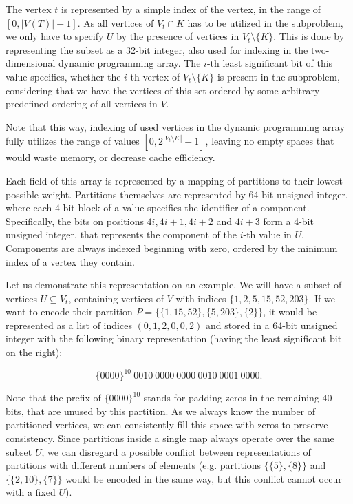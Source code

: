 \documentclass[thesis=M,english,hidelinks]{FITthesis}[2012/10/20]
\theoremstyle{definition}
\begin{document}
The vertex $t$ is represented by a simple index of the vertex, in the range of $[0, |V(T)| - 1]$. As all
vertices of $V_t \cap K$ has to be utilized in the subproblem, we only have to specify $U$ by the presence of vertices in
$V_t \setminus \{K\}$. This is done by representing the subset as a 32-bit integer, also used for indexing in the
two-dimensional dynamic programming array. The $i$-th least significant bit of this value specifies, whether the $i$-th
vertex of $V_t \setminus \{K\}$ is present in the subproblem, considering that we have the vertices of this set ordered
by some arbitrary predefined ordering of all vertices in $V$.

Note that this way, indexing of used vertices in the dynamic programming array fully utilizes the range of values $[0,
2^{|V_t \setminus K|}-1]$, leaving no empty spaces that would waste memory, or decrease cache efficiency.

Each field of this array is represented by a mapping of partitions to their lowest possible weight. Partitions
themselves are represented by 64-bit unsigned integer, where each 4 bit block of a value specifies the identifier of a
component. Specifically, the bits on positions $4i, 4i+1, 4i+2$ and $4i + 3$ form a 4-bit unsigned integer, that
represents the component of the $i$-th value in $U$. Components are always indexed beginning with zero, ordered by the
minimum index of a vertex they contain.

Let us demonstrate this representation on an example. We will have a subset of vertices $U \subseteq V_t$, containing
vertices of $V$ with indices $\{1, 2, 5, 15, 52, 203\}$. If we want to encode their partition $P = \{\{1, 15, 52\},
\{5, 203\}, \{2\}\}$, it would be represented as a list of indices $(0, 1, 2, 0, 0, 2)$ and stored in a 64-bit unsigned
integer with the following binary representation (having the least significant bit on the right):

$$
\{0000\}^{10}\ 0010\ 0000\ 0000\ 0010\ 0001\ 0000.
$$

Note that the prefix of $\{0000\}^{10}$ stands for padding zeros in the remaining 40 bits, that are unused by this
partition. As we always know the number of partitioned vertices, we can consistently fill this space with zeros to
preserve consistency. Since partitions inside a single map always operate over the same subset $U$, we can disregard
a possible conflict between representations of partitions with different numbers of elements (e.g. partitions
$\{\{5\}, \{8\}\}$ and $\{\{2, 10\}, \{7\}\}$ would be encoded in the same way, but this conflict cannot occur with a
fixed $U$).
\end{document}
